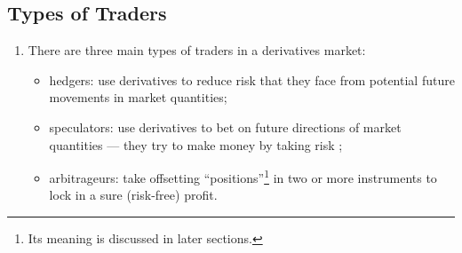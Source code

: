\subsection{Types of Traders}
\begin{enumerate}
\item There are three main types of traders in a derivatives market:
\begin{itemize}
\item hedgers: use derivatives to reduce risk  that they face
from potential future movements  in market quantities;
\item speculators: use derivatives to bet  on future directions
of market quantities  --- they try to make money
 by taking risk ;
\item arbitrageurs: take offsetting ``positions''\footnote{Its meaning is
discussed in later sections.} in two or more instruments to lock in a sure
(risk-free) profit.
\end{itemize}
\end{enumerate}

